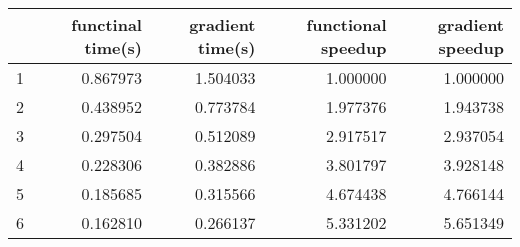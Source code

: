 \begin{tabular}{lrrrr}
\toprule
{} &  functinal time(s) &  gradient time(s) &  functional speedup &  gradient speedup \\
\midrule
1 &           0.867973 &          1.504033 &            1.000000 &          1.000000 \\
2 &           0.438952 &          0.773784 &            1.977376 &          1.943738 \\
3 &           0.297504 &          0.512089 &            2.917517 &          2.937054 \\
4 &           0.228306 &          0.382886 &            3.801797 &          3.928148 \\
5 &           0.185685 &          0.315566 &            4.674438 &          4.766144 \\
6 &           0.162810 &          0.266137 &            5.331202 &          5.651349 \\
\bottomrule
\end{tabular}
